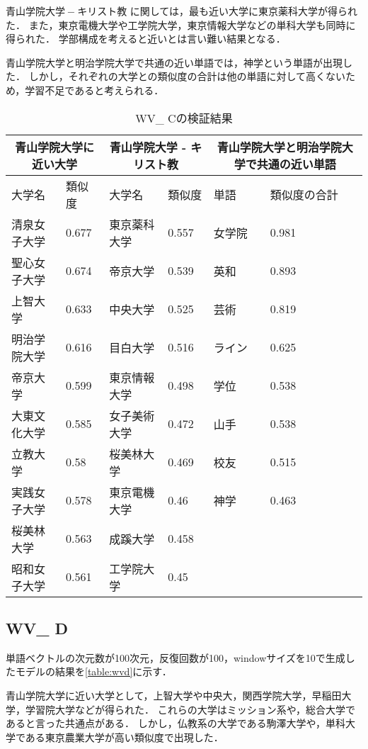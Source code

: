 $ 青山学院大学 - キリスト教 $ に関しては，最も近い大学に東京薬科大学が得られた．
また，東京電機大学や工学院大学，東京情報大学などの単科大学も同時に得られた．
学部構成を考えると近いとは言い難い結果となる．

青山学院大学と明治学院大学で共通の近い単語では，神学という単語が出現した．
しかし，それぞれの大学との類似度の合計は他の単語に対して高くないため，学習不足であると考えられる．

\begin{table}[H]
\caption{WV\_ Cの検証結果}
\centering
\footnotesize
\begin{tabular}{ll|ll|ll}
\hline
\multicolumn{2}{c}{青山学院大学に近い大学} & \multicolumn{2}{c}{青山学院大学 - キリスト教} & \multicolumn{2}{c}{青山学院大学と明治学院大学で共通の近い単語}
\\ \hline
大学名 & 類似度 & 大学名 & 類似度 & 単語 & 類似度の合計
\\ \hline \hline
清泉女子大学 & 0.677 & 東京薬科大学 & 0.557 & 女学院 & 0.981\\
聖心女子大学 & 0.674 & 帝京大学 & 0.539 & 英和 & 0.893\\
上智大学 & 0.633 & 中央大学 & 0.525 & 芸術 & 0.819\\
明治学院大学 & 0.616 & 目白大学 & 0.516 & ライン & 0.625\\
帝京大学 & 0.599 & 東京情報大学 & 0.498 & 学位 & 0.538\\
大東文化大学 & 0.585 & 女子美術大学 & 0.472 & 山手 & 0.538\\
立教大学 & 0.58 & 桜美林大学 & 0.469 & 校友 & 0.515\\
実践女子大学 & 0.578 & 東京電機大学 & 0.46 & 神学 & 0.463\\
桜美林大学 & 0.563 & 成蹊大学 & 0.458 & & \\
昭和女子大学 & 0.561 & 工学院大学 & 0.45 & & \\ \hline
\end{tabular}
\label{table:wvc}
\end{table}


\subsection{WV\_ D}
単語ベクトルの次元数が100次元，反復回数が100，windowサイズを10で生成したモデルの結果を\ref{table:wvd}に示す．

青山学院大学に近い大学として，上智大学や中央大，関西学院大学，早稲田大学，学習院大学などが得られた．
これらの大学はミッション系や，総合大学であると言った共通点がある．
しかし，仏教系の大学である駒澤大学や，単科大学である東京農業大学が高い類似度で出現した．

